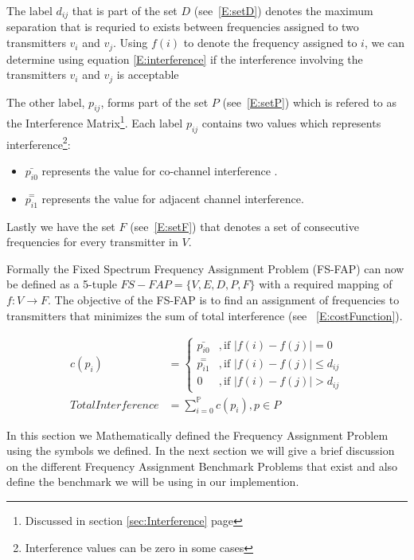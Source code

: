 The label $d_{ij}$ that is part of the set $D$ (see~\ref{E:setD}) denotes the maximum separation that is requried to exists between frequencies assigned to two transmitters $v_i$ and $v_j$. Using $f(i)$ to denote the frequency assigned to $i$, we can determine using equation \ref{E:interference} if the interference involving the transmitters $v_i$ and $v_j$ is acceptable\cite{FAPOrientationModel,TabuMontemanniSmith}

The other label, $p_{ij}$, forms part of the set $P$ (see~\ref{E:setP}) which is refered to as the Interference Matrix\footnote{Discussed in section \ref{sec:Interference} page \pageref{sec:Interference}}. Each label $p_{ij}$ contains two values which represents interference\footnote{Interference values can be zero in some cases}:
\begin{itemize}
\item $\bar{p_{i0}}$ represents the value for co-channel interference \cite{FAPOrientationModel,TabuMontemanniSmith}. 
\item $\overset{=}{p_{i1}}$ represents the value for adjacent channel interference\cite{FAPOrientationModel,TabuMontemanniSmith}.
\end{itemize}

Lastly we have the set $F$ (see~\ref{E:setF}) that denotes a set of consecutive frequencies for every transmitter in $V$\cite{FAPOrientationModel,TabuMontemanniSmith}.

Formally the Fixed Spectrum Frequency Assignment Problem (FS-FAP) can now be defined as a 5-tuple \(FS-FAP = \{V,E,D,P,F\}\) with a required mapping of \(f: V \rightarrow F\)\cite{TabuMontemanniSmith}. The objective of the FS-FAP is to find an assignment of frequencies to transmitters that minimizes the sum of total interference (see ~\ref{E:costFunction}).

\begin{align} 
 c(p_i) &= 
 \begin{cases}
	\bar{p_{i0}} &,\text{if $|f(i) - f(j)| = 0$}\\
	\overset{=}{p_{i1}} &, \text{if $|f(i) - f(j)| \leqslant d_{ij}$}\\
	0 &,\text{if $|f(i) - f(j)| > d_{ij}$}
 \end{cases}\\
 Total Interference &= \sum^\mathbb{P}_{i = 0}c(p_i),p \in P \label{E:costFunction}
\end{align}

In this section we Mathematically defined the Frequency Assignment Problem using the symbols we defined. In the next section we will give a brief discussion on the different Frequency Assignment Benchmark Problems that exist and also define the benchmark we will be using in our implemention.
